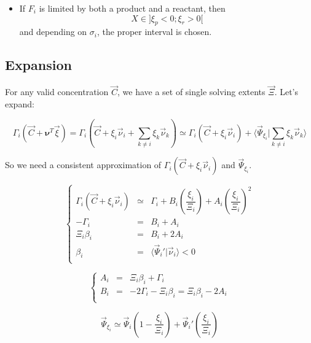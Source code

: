 \documentclass[aps,12pt]{revtex4}
\begin{document}
\begin{itemize}
\begin{itemize}
	\item If $F_i$ is limited by both a product and a reactant, then $$X\in\rbrack \xi_p < 0 ; \xi_r > 0 \lbrack$$
	and depending on $\sigma_i$, the proper interval is chosen.
	\end{itemize}
	
\end{itemize}

\subsection{Expansion}

 
For any valid concentration $\vec{C}$, we have a set of single solving extents $\vec{\Xi}$.
Let's expand:

\begin{equation}
\Gamma_i(\vec{C} + \bm{\nu}^T \vec{\xi}) =  \Gamma_i(\vec{C} + \xi_i \vec{\nu}_i + \sum_{k\not=i} \xi_k \vec{\nu}_k)
\simeq \Gamma_i(\vec{C} + \xi_i \vec{\nu}_i) + \langle \vec{\Psi}_{\xi_i} \vert \sum_{k\not=i} \xi_k \vec{\nu}_k \rangle
\end{equation}

So we need a consistent approximation of $\Gamma_i(\vec{C} + \xi_i \vec{\nu}_i)$ and $\vec{\Psi}_{\xi_i}$.

\begin{equation}
\left\lbrace
\begin{array}{rcl}
	\Gamma_i(\vec{C} + \xi_i \vec{\nu}_i) & \simeq & \Gamma_i + B_i \left(\dfrac{\xi_i}{\Xi_i}\right) + A_i \left(\dfrac{\xi_i}{\Xi_i}\right)^2\\
	-\Gamma_i & = & B_i   + A_i  \\
	\Xi_i\beta_i   & = & B_i + 2 A_i   \\
	\beta_i        & = & \langle \vec{\Psi}_i' \vert \vec{\nu}_i \rangle < 0\\
\end{array}
\right.
\end{equation}

\begin{equation}
\left\lbrace
\begin{array}{rcl}
 A_i & = & \Xi_i \beta_i + \Gamma_i \\
 B_i & = & -2\Gamma_i - \Xi_i \beta_i = \Xi_i \beta_i - 2A_i\\
\end{array}
\right.
\end{equation}

\begin{equation}
\vec{\Psi}_{\xi_i} \simeq \vec{\Psi}_i \left(1- \dfrac{\xi_i}{\Xi_i}\right) + \vec{\Psi}_i' \left(\dfrac{\xi_i}{\Xi_i}\right)
\end{equation}
\end{document}
